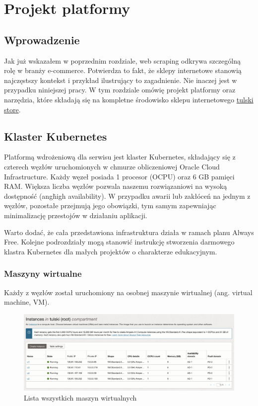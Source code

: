 \newpage

\section{Projekt platformy}

\subsection{Wprowadzenie}

Jak już wskazałem w poprzednim rozdziale, web scraping odkrywa szczególną rolę w branży e-commerce.
Potwierdza to fakt, że sklepy internetowe stanowią najczęstszy kontekst i przykład ilustrujący to zagadnienie.
Nie inaczej jest w przypadku niniejszej pracy.
W tym rozdziale omówię projekt platformy oraz narzędzia, które składają się na kompletne środowisko sklepu internetowego \href{https://store.tulski.com}{tulski store}.

\subsection{Klaster Kubernetes}

Platformą wdrożeniową dla serwisu jest klaster Kubernetes\cite{what-is-kubernetes}, składający się z czterech węzłów uruchomionych w chmurze obliczeniowej Oracle Cloud Infrastructure.
Każdy węzeł posiada 1 procesor (OCPU) oraz 6 GB pamięci RAM. Większa liczba węzłów pozwala naszemu rozwiązaniowi na wysoką dostępność (ang\. high availability).
W przypadku awarii lub zakłóceń na jednym z węzłów, pozostałe przejmują jego obowiązki, tym samym zapewniając minimalizację przestojów w działaniu aplikacji.

Warto dodać, że cała przedstawiona infrastruktura działa w ramach planu Always Free.
Kolejne podrozdziały mogą stanowić instrukcję stworzenia darmowego klastra Kubernetes dla małych projektów o charakterze edukacyjnym.

\subsubsection{Maszyny wirtualne}

Każdy z węzłów został uruchomiony na osobnej maszynie wirtualnej (ang. virtual machine, VM).

\begin{figure}[H]
    \centering
    \includegraphics[width=\textwidth]{img/oci-compute-instances}
    \caption{Lista wszystkich maszyn wirtualnych}
    \label{fig:oci-compute-instances}
\end{figure}

